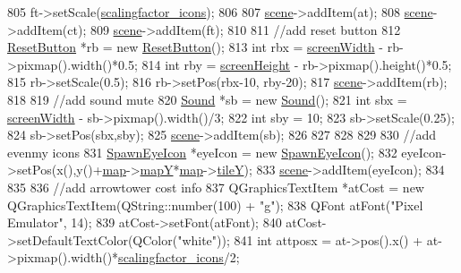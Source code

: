 \begin{DoxyCode}
805     ft->setScale(\hyperlink{class_game_a50835e7c47a3e5d6fc919ce3a163be88}{scalingfactor\_icons});
806 
807     \hyperlink{class_game_a8119e3b9a632906c6808fa294b46a92a}{scene}->addItem(at);
808     \hyperlink{class_game_a8119e3b9a632906c6808fa294b46a92a}{scene}->addItem(ct);
809     \hyperlink{class_game_a8119e3b9a632906c6808fa294b46a92a}{scene}->addItem(ft);
810 
811     \textcolor{comment}{//add reset button}
812     \hyperlink{class_reset_button}{ResetButton} *rb = \textcolor{keyword}{new} \hyperlink{class_reset_button}{ResetButton}();
813     \textcolor{keywordtype}{int} rbx = \hyperlink{class_game_ab1ca40d8527bb09e773bb97030b7a5cc}{screenWidth} - rb->pixmap().width()*0.5;
814     \textcolor{keywordtype}{int} rby = \hyperlink{class_game_a329351d67993953391a6a65db536c017}{screenHeight} - rb->pixmap().height()*0.5;
815     rb->setScale(0.5);
816     rb->setPos(rbx-10, rby-20);
817     \hyperlink{class_game_a8119e3b9a632906c6808fa294b46a92a}{scene}->addItem(rb);
818 
819     \textcolor{comment}{//add sound mute}
820     \hyperlink{class_sound}{Sound} *sb = \textcolor{keyword}{new} \hyperlink{class_sound}{Sound}();
821     \textcolor{keywordtype}{int} sbx = \hyperlink{class_game_ab1ca40d8527bb09e773bb97030b7a5cc}{screenWidth} - sb->pixmap().width()/3;
822     \textcolor{keywordtype}{int} sby = 10;
823     sb->setScale(0.25);
824     sb->setPos(sbx,sby);
825     \hyperlink{class_game_a8119e3b9a632906c6808fa294b46a92a}{scene}->addItem(sb);
826 
827 
828 
829 
830     \textcolor{comment}{//add evenmy icons}
831     \hyperlink{class_spawn_eye_icon}{SpawnEyeIcon} *eyeIcon = \textcolor{keyword}{new} \hyperlink{class_spawn_eye_icon}{SpawnEyeIcon}();
832     eyeIcon->setPos(x(),y()+\hyperlink{class_game_acef3a39fdf14be2c980b0dc11e7be402}{map}->\hyperlink{class_map_ae08efae9ac1453b2690985c627aca358}{mapY}*\hyperlink{class_game_acef3a39fdf14be2c980b0dc11e7be402}{map}->\hyperlink{class_map_a483dfba507cee9d2fa60a074992b1fcf}{tileY});
833     \hyperlink{class_game_a8119e3b9a632906c6808fa294b46a92a}{scene}->addItem(eyeIcon);
834 
835 
836     \textcolor{comment}{//add arrowtower cost info}
837     QGraphicsTextItem *atCost = \textcolor{keyword}{new} QGraphicsTextItem(QString::number(100) + \textcolor{stringliteral}{"g"});
838     QFont atFont(\textcolor{stringliteral}{"Pixel Emulator"}, 14);
839     atCost->setFont(atFont);
840     atCost->setDefaultTextColor(QColor(\textcolor{stringliteral}{"white"}));
841     \textcolor{keywordtype}{int} attposx = at->pos().x() + at->pixmap().width()*\hyperlink{class_game_a50835e7c47a3e5d6fc919ce3a163be88}{scalingfactor\_icons}/2;

\end{DoxyCode}
